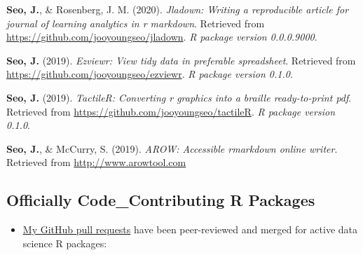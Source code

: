 \documentclass[11pt, a4paper]{awesome-cv}
\providecommand{\tightlist}{%
	\setlength{\itemsep}{0pt}\setlength{\parskip}{0pt}}
\begin{document}
\leavevmode\hypertarget{ref-R-jladown}{}%
\textbf{Seo, J.}, \& Rosenberg, J. M. (2020). \emph{Jladown: Writing a
reproducible article for journal of learning analytics in r markdown}.
Retrieved from \url{https://github.com/jooyoungseo/jladown}. \emph{R
package version 0.0.0.9000}.

\leavevmode\hypertarget{ref-R-ezviewr}{}%
\textbf{Seo, J.} (2019). \emph{Ezviewr: View tidy data in preferable
spreadsheet}. Retrieved from
\url{https://github.com/jooyoungseo/ezviewr}. \emph{R package version
0.1.0}.

\leavevmode\hypertarget{ref-R-tactileR}{}%
\textbf{Seo, J.} (2019). \emph{TactileR: Converting r graphics into a
braille ready-to-print pdf}. Retrieved from
\url{https://github.com/jooyoungseo/tactileR}. \emph{R package version
0.1.0}.

\leavevmode\hypertarget{ref-webrender}{}%
\textbf{Seo, J.}, \& McCurry, S. (2019). \emph{AROW: Accessible
rmarkdown online writer}. Retrieved from \url{http://www.arowtool.com}

\hypertarget{officially-code_contributing-r-packages}{%
\subsection{Officially Code\_Contributing R
Packages}\label{officially-code_contributing-r-packages}}

\begin{itemize}
\tightlist
\item
  \href{https://github.com/pulls?q=is\%3Apr+author\%3Ajooyoungseo+archived\%3Afalse+is\%3Aclosed}{My
  GitHub pull requests} have been peer-reviewed and merged for active
  data science R packages:
\end{itemize}
\end{document}
